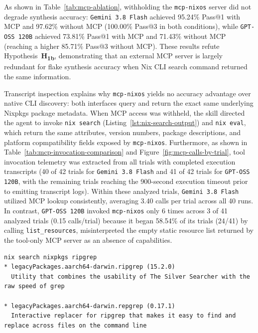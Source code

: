 As shown in Table~\ref{tab:mcp-ablation}, withholding the \texttt{mcp-nixos}
server did not degrade synthesis accuracy: \texttt{Gemini 3.8 Flash} achieved
95.24\% Pass@1 with MCP and 97.62\% without MCP (100.00\% Pass@3 in both
conditions), while \texttt{GPT-OSS 120B} achieved 73.81\% Pass@1 with MCP and
71.43\% without MCP (reaching a higher 85.71\% Pass@3 without MCP). These results
refute Hypothesis~\textbf{H\textsubscript{1b}}, demonstrating that an external MCP
server is largely redundant for flake synthesis accuracy when Nix CLI search command
returned the same information.

Transcript inspection explains why \texttt{mcp-nixos} yields no accuracy
advantage over native CLI discovery: both interfaces query and return the exact same
underlying Nixpkgs package metadata. When MCP access was withheld, the skill directed
the agent to invoke \texttt{nix search} (Listing~\ref{lst:nix-search-output})
and \texttt{nix eval}, which return the same attributes, version numbers,
package descriptions, and platform copmpatibility fields
exposed by \texttt{mcp-nixos}. Furthermore, as shown in Table~\ref{tab:mcp-invocation-comparison}
and Figure~\ref{fig:mcp-calls-by-trial}, tool invocation telemetry was extracted
from all trials with completed execution transcripts (40 of 42 trials for \texttt{Gemini
	3.8 Flash} and 41 of 42 trials for \texttt{GPT-OSS 120B}, with the remaining
trials reaching the 900-second execution timeout prior to emitting transcript
logs). Within these analyzed trials, \texttt{Gemini 3.8 Flash} utilized MCP
lookup consistently, averaging 3.40 calls per trial across all 40 runs. In
contrast, \texttt{GPT-OSS 120B} invoked \texttt{mcp-nixos} only 6 times across 3 of
41 analyzed trials (0.15 calls/trial) because it began 58.54\% of its trials (24/41)
by calling \texttt{list\_resources}, misinterpreted the empty static resource
list returned by the tool-only MCP server as an absence of capabilities.

\begin{lstlisting}[caption={Example \texttt{nix search} Output for Package Discovery}, label={lst:nix-search-output}]
nix search nixpkgs ripgrep
* legacyPackages.aarch64-darwin.ripgrep (15.2.0)
  Utility that combines the usability of The Silver Searcher with the raw speed of grep

* legacyPackages.aarch64-darwin.repgrep (0.17.1)
  Interactive replacer for ripgrep that makes it easy to find and replace across files on the command line
\end{lstlisting}

